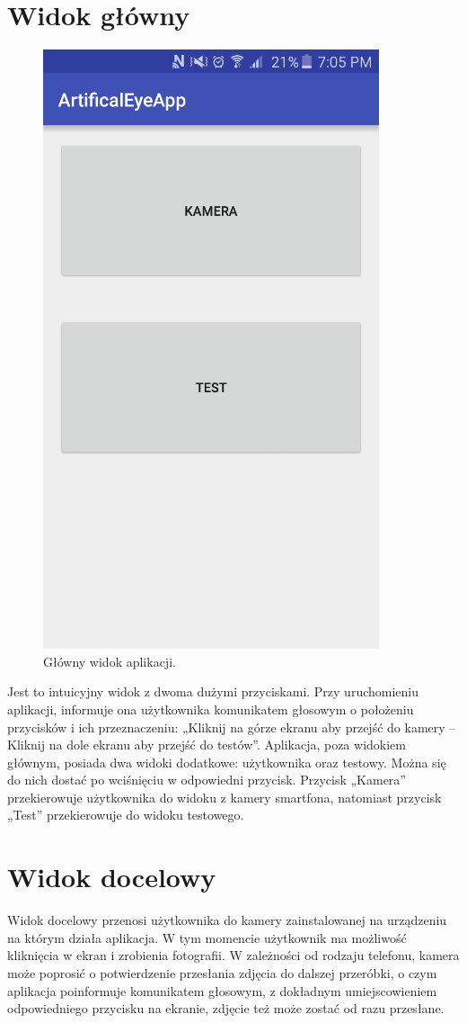 \documentclass[eng,oneside]{mgr}
\begin{document}
\section {Widok główny}
\begin{figure}[htbp]
\centering
\includegraphics{glownywidok.png}
\caption{Główny widok aplikacji.}\par\medskip
\end{figure}
Jest to intuicyjny widok z dwoma dużymi przyciskami. Przy uruchomieniu aplikacji, informuje ona użytkownika komunikatem głosowym o położeniu przycisków i ich przeznaczeniu: „Kliknij na górze ekranu aby przejść do kamery – Kliknij na dole ekranu aby przejść do testów”. Aplikacja, poza widokiem głównym, posiada dwa widoki dodatkowe: użytkownika oraz testowy. Można się do nich dostać po wciśnięciu w odpowiedni przycisk. Przycisk „Kamera” przekierowuje użytkownika do widoku z kamery smartfona, natomiast przycisk „Test” przekierowuje do widoku testowego.
\section {Widok docelowy}
\hspace{1cm} Widok docelowy przenosi użytkownika do kamery zainstalowanej na urządzeniu na którym działa aplikacja. W tym momencie użytkownik ma możliwość kliknięcia w ekran i zrobienia fotografii. W zależności od rodzaju telefonu, kamera może poprosić o potwierdzenie przesłania zdjęcia do dalszej przeróbki, o czym aplikacja poinformuje komunikatem głosowym, z dokładnym umiejscowieniem odpowiedniego przycisku na ekranie, zdjęcie też może zostać od razu przesłane.
\end{document}
